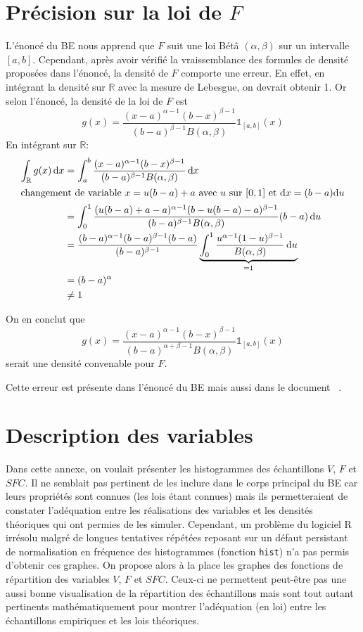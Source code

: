 \documentclass{book}
\begin{document}
\chapter{Précision sur la loi de $F$}
L'énoncé du BE nous apprend que $F$ suit une loi Bétâ $(\alpha, \beta)$ sur un intervalle $[a, b]$.
Cependant, après avoir vérifié la vraissemblance des formules de densité proposées dans l'énoncé, la densité de $F$ comporte une erreur.
En effet, en intégrant la densité sur $\mathbb{R}$ avec la mesure de Lebesgue, on devrait obtenir 1. Or selon l'énoncé, la densité de la loi de $F$ est 
\[g(x) = \frac{(x-a)^{\alpha-1}(b-x)^{\beta-1}}{(b-a)^{\beta -1}B(\alpha,\beta)}\mathds{1}_{[a,b]}(x)\]
En intégrant sur $\mathbb{R}$:
\begin{align*}
\int_\mathbb{R} g(x) \, \mathrm{d}x &= \int_{a}^{b} \frac{(x-a)^{\alpha-1}(b-x)^{\beta-1}}{(b-a)^{\beta -1}B(\alpha,\beta)} \, \mathrm{d}x\\
\intertext{changement de variable $x=u(b-a)+a$ avec $u$ sur $[0,1]$ et $\mathrm{d}x=(b-a)\mathrm{d}u$}
        &= \int_{0}^{1}\frac{(u(b-a)+a-a)^{\alpha-1}(b-u(b-a)-a)^{\beta-1}}{(b-a)^{\beta -1}B(\alpha,\beta)}(b-a) \, \mathrm{d}u \\
        &= \frac{(b-a)^{\alpha-1}(b-a)^{\beta-1}(b-a)}{(b-a)^{\beta-1}} \underbrace{\int_0^1\frac{u^{\alpha-1}(1-u)^{\beta-1}}{B(\alpha,\beta)}\, \mathrm{d}u}_{=1} \\
        &= (b-a)^{\alpha} \\
        &\neq 1
 \end{align*}
 
On en conclut que
\[g(x) = \frac{(x-a)^{\alpha-1}(b-x)^{\beta-1}}{(b-a)^{\alpha + \beta -1}B(\alpha,\beta)}\mathds{1}_{[a,b]}(x)\]
serait une densité convenable pour $F$.

Cette erreur est présente dans l'énoncé du BE mais aussi dans le document ~\cite{ref2}.

\chapter{Description des variables}
Dans cette annexe, on voulait présenter les histogrammes des échantillons $V$, $F$ et $SFC$. Il ne semblait pas pertinent de les inclure dans le corps principal du BE car leurs propriétés sont connues (les lois étant connues) mais ils permetteraient de constater l'adéquation entre les réalisations des variables et les densités théoriques qui ont permies de les simuler. Cependant, un problème du logiciel R irrésolu malgré de longues tentatives répétées reposant sur un défaut persistant de normalisation en fréquence des histogrammes (fonction \texttt{hist}) n'a pas permis d'obtenir ces graphes. On propose alors à la place les graphes des fonctions de répartition des variables $V$, $F$ et $SFC$. Ceux-ci ne permettent peut-être pas une aussi bonne visualisation de la répartition des échantillons mais sont tout autant pertinents mathématiquement pour montrer l'adéquation (en loi) entre les échantillons empiriques et les lois théoriques.
\end{document}
